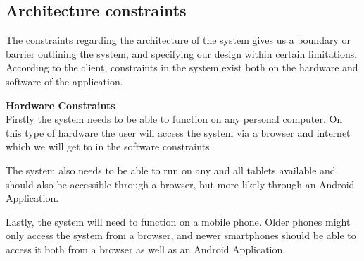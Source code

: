 \documentclass[12pt, a4paper]{scrartcl}
\begin{document}
			\subsection{Architecture constraints}
				The constraints regarding the architecture of the system gives us a boundary or 	barrier outlining the system, and specifying our design within certain limitations.
According to the client, constraints in the system exist both on the hardware and software of the application.

				\textbf{Hardware Constraints}\\
				Firstly the system needs to be able to function on any personal computer. On this type of hardware the user will access the system via a browser and internet which we will get to in the software constraints.
 
				The system also needs to be able to run on any and all tablets available and should also be accessible through a browser, but more likely through an Android Application.

				Lastly, the system will need to function on a mobile phone. Older phones might only access the system from a browser, and newer smartphones should be able to access it both from a browser as well as an Android Application.
\end{document}
